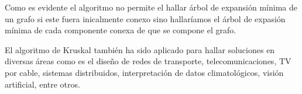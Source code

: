 Como es evidente el algoritmo no permite el hallar árbol de expansión mínima de un grafo si este fuera inicalmente conexo sino hallaríamos el árbol de expasión mínima de cada componente conexa de que se compone el grafo.

El algoritmo de Kruskal también ha sido aplicado para hallar soluciones en diversas áreas como es el diseño de redes de transporte, telecomunicaciones, TV por cable, sistemas distribuidos, interpretación de datos climatológicos, visión artificial, entre otros.